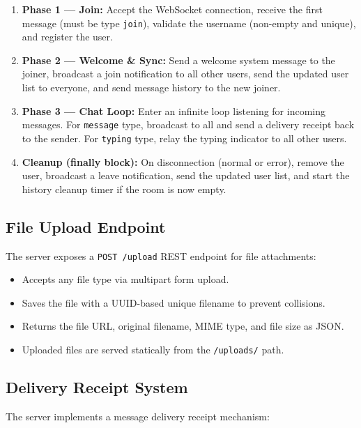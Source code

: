 \documentclass[12pt, a4paper]{article}
\begin{document}
\begin{enumerate}[leftmargin=*]
    \item \textbf{Phase 1 — Join:} Accept the WebSocket connection, receive the first message (must be type \texttt{join}), validate the username (non-empty and unique), and register the user.

    \item \textbf{Phase 2 — Welcome \& Sync:} Send a welcome system message to the joiner, broadcast a join notification to all other users, send the updated user list to everyone, and send message history to the new joiner.

    \item \textbf{Phase 3 — Chat Loop:} Enter an infinite loop listening for incoming messages. For \texttt{message} type, broadcast to all and send a delivery receipt back to the sender. For \texttt{typing} type, relay the typing indicator to all other users.

    \item \textbf{Cleanup (finally block):} On disconnection (normal or error), remove the user, broadcast a leave notification, send the updated user list, and start the history cleanup timer if the room is now empty.
\end{enumerate}

\subsection{File Upload Endpoint}

The server exposes a \texttt{POST /upload} REST endpoint for file attachments:

\begin{itemize}[leftmargin=*]
    \item Accepts any file type via multipart form upload.
    \item Saves the file with a UUID-based unique filename to prevent collisions.
    \item Returns the file URL, original filename, MIME type, and file size as JSON.
    \item Uploaded files are served statically from the \texttt{/uploads/} path.
\end{itemize}

\subsection{Delivery Receipt System}

The server implements a message delivery receipt mechanism:
\end{document}

